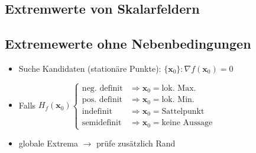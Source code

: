 \documentclass[6pt,a4paper]{scrartcl}
\newcommand{\eset}[1]{\ensuremath{\bigl\{#1\bigr\}}}											%
\renewcommand{\vec}[1]{\ensuremath{\boldsymbol {#1}}}											%
\newcommand{\ra}[0]{\ensuremath{\rightarrow}} 									%
\begin{document}
\begin{multicols*}{4}
\section{Extremwerte von Skalarfeldern}
\subsection{Extremewerte ohne Nebenbedingungen} %
\begin{itemize} \itemsep0pt
	\item Suche Kandidaten (stationäre Punkte): $\eset{\vec x_0}:{\nabla f(\vec x_0) = 0}$
	\item Falls $H_f(\vec x_0) \begin{cases} \text{neg. definit} & \Rightarrow \vec x_0 = \text{lok. Max.} \\ \text{pos. definit} & \Rightarrow \vec x_0 = \text{lok. Min.} \\ \text{indefinit} & \Rightarrow \vec x_0 = \text{Sattelpunkt} \\ \text{semidefinit} & \Rightarrow \vec x_0 = \text{keine Aussage} \end{cases}$\\
	\item globale Extrema $\ra $ prüfe zusätzlich Rand
\end{itemize}


\end{multicols*}
\end{document}
